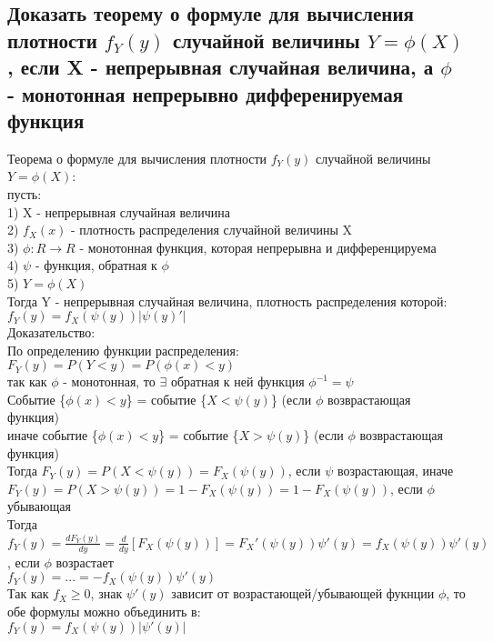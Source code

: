 \subsection{Доказать теорему о формуле для вычисления плотности $f_{Y}(y)$ случайной величины $Y  = \phi(X)$, если X - непрерывная случайная величина, а $\phi$ - монотонная непрерывно дифференируемая функция}
Теорема о формуле для вычисления плотности $f_{Y}(y)$ случайной величины $Y  = \phi(X)$:\\
пусть:\\
1) X - непрерывная случайная величина\\
2) $f_{X}(x)$ - плотность распределения случайной величины X\\
3) $\phi : R \rightarrow R$ - монотонная функция, которая непрерывна и дифференцируема\\
4) $\psi$ - функция, обратная к $\phi$\\
5) $Y = \phi(X)$\\
Тогда Y - непрерывная случайная величина, плотность распределения которой:\\
$f_{Y}(y) = f_{X}(\psi(y))|\psi(y)'|$\\

Доказательство:\\
По определению функции распределения:\\
$F_{Y}(y) = P(Y < y) = P(\phi(x) < y)$\\
так как $\phi$ - монотонная, то $\exists$ обратная к ней функция $\phi^{-1} = \psi$\\
Событие \{$\phi(x) < y$\} = событие \{$X < \psi(y)$\} (если $\phi$ возврастающая функция)\\
иначе событие \{$\phi(x) < y$\} = событие \{$X > \psi(y)$\} (если $\phi$ возврастающая функция)\\
Тогда $F_{Y}(y) = P(X < \psi(y)) = F_{X}(\psi(y))$, если $\psi$ возрастающая, иначе\\
$F_{Y}(y) = P(X > \psi(y)) = 1 - F_{X}(\psi(y)) = 1 - F_{X}(\psi(y))$, если $\phi$ убывающая\\
Тогда $f_{Y}(y) = \frac{dF_{Y}(y)}{dy} = \frac{d}{dy}[F_{X}(\psi(y))] = F_{X}'(\psi(y))\psi'(y) = f_{X}(\psi(y))\psi'(y)$, если $\phi$ возрастает\\
$f_{Y}(y) = ... = -f_{X}(\psi(y))\psi'(y)$\\
Так как $f_{X} \geqslant 0$, знак $\psi'(y)$ зависит от возрастающей/убывающей фукнции $\phi$, то обе формулы можно объединить в:\\
$f_{Y}(y) = f_{X}(\psi(y))|\psi'(y)|$\\

